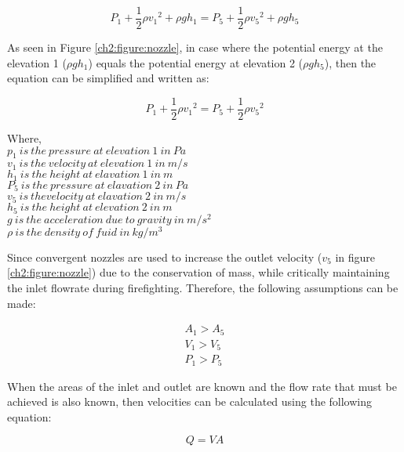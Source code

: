 \begin{equation}
    P_1+\frac{1}{2}\rho{v_1}^2 + \rho gh_1 = P_5+\frac{1}{2}\rho{v_5}^2 + \rho gh_5
\end{equation}

As seen in Figure \ref{ch2:figure:nozzle}, in case where the potential energy at the elevation 1 ($\rho gh_1$) equals the potential energy at elevation 2 ($\rho gh_5$), then the equation can be simplified and written as:

\begin{equation}
    P_1+\frac{1}{2}\rho{v_1}^2 = P_5+\frac{1}{2}\rho{v_5}^2
\end{equation}

\begin{doublespace}
    Where, \\
    $p_1\ is\ the\ pressure\ at\ elevation\ 1\ in\ Pa$ \\
    $v_1\ is\ the\ velocity\ at\ elevation\ 1\ in\ m/s$ \\
    $h_1\ is\ the\ height\ at\ elavation\ 1\ in\ m$ \\
    $P_5\ is\ the\ pressure\ at\ elavation\ 2\ in\ Pa$ \\
    $v_5\ is\ the velocity\ at\ elavation\ 2\ in\ m/s$ \\
    $h_5\ is\ the\ height\ at\ elevation\ 2\ in\ m$ \\
    $g\ is\ the\ acceleration\ due\ to\ gravity\ in\ m/s^2$ \\
    $\rho\ is\ the\ density\ of\ fuid\ in\ kg/m^3$ \\
\end{doublespace}

Since convergent nozzles are used to increase the outlet velocity ($v_5$  in figure \ref{ch2:figure:nozzle}) due to the conservation of mass, while critically maintaining the inlet flowrate during firefighting. Therefore, the following assumptions can be made:

\begin{gather*}
    A_1 > A_5 \\
    V_1 > V_5 \\
    P_1 > P_5
\end{gather*}

When the areas of the inlet and outlet are known and the flow rate that must be achieved is also known, then velocities can be calculated using the following equation:

\begin{equation}
    Q = VA
\end{equation}


